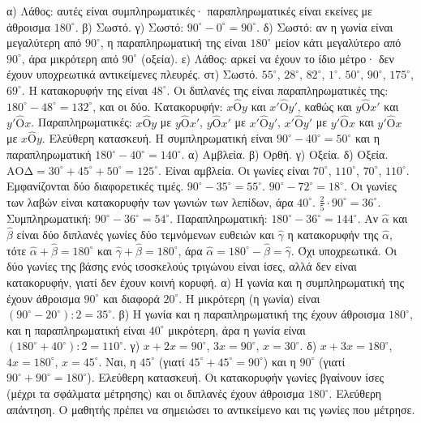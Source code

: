  α) Λάθος: αυτές είναι συμπληρωματικές· παραπληρωματικές είναι εκείνες με άθροισμα $180^\circ$. β) Σωστό. γ) Σωστό: $90^\circ-0^\circ=90^\circ$. δ) Σωστό: αν η γωνία είναι μεγαλύτερη από $90^\circ$, η παραπληρωματική της είναι $180^\circ$ μείον κάτι μεγαλύτερο από $90^\circ$, άρα μικρότερη από $90^\circ$ (οξεία). ε) Λάθος: αρκεί να έχουν το ίδιο μέτρο· δεν έχουν υποχρεωτικά αντικείμενες πλευρές. στ) Σωστό.
 $55^\circ$, $28^\circ$, $82^\circ$, $1^\circ$.
 $50^\circ$, $90^\circ$, $175^\circ$, $69^\circ$.
 Η κατακορυφήν της είναι $48^\circ$. Οι διπλανές της είναι παραπληρωματικές της: $180^\circ-48^\circ=132^\circ$, και οι δύο.
 Κατακορυφήν: $x\hat{\mathrm{Ο}}y$ και $x'\hat{\mathrm{Ο}}y'$, καθώς και $y\hat{\mathrm{Ο}}x'$ και $y'\hat{\mathrm{Ο}}x$. Παραπληρωματικές: $x\hat{\mathrm{Ο}}y$ με $y\hat{\mathrm{Ο}}x'$, $y\hat{\mathrm{Ο}}x'$ με $x'\hat{\mathrm{Ο}}y'$, $x'\hat{\mathrm{Ο}}y'$ με $y'\hat{\mathrm{Ο}}x$ και $y'\hat{\mathrm{Ο}}x$ με $x\hat{\mathrm{Ο}}y$.
 Ελεύθερη κατασκευή. Η συμπληρωματική είναι $90^\circ-40^\circ=50^\circ$ και η παραπληρωματική $180^\circ-40^\circ=140^\circ$.
 α) Αμβλεία. β) Ορθή. γ) Οξεία. δ) Οξεία.
 $\mathrm{ΑΟΔ}=30^\circ+45^\circ+50^\circ=125^\circ$. Είναι αμβλεία.
 Οι γωνίες είναι $70^\circ$, $110^\circ$, $70^\circ$, $110^\circ$. Εμφανίζονται δύο διαφορετικές τιμές.
 $90^\circ-35^\circ=55^\circ$.
 $90^\circ-72^\circ=18^\circ$.
 Οι γωνίες των λαβών είναι κατακορυφήν των γωνιών των λεπίδων, άρα $40^\circ$.
 $\frac{2}{5}\cdot90^\circ=36^\circ$. Συμπληρωματική: $90^\circ-36^\circ=54^\circ$. Παραπληρωματική: $180^\circ-36^\circ=144^\circ$.
 Αν $\hat{\alpha}$ και $\hat{\beta}$ είναι δύο διπλανές γωνίες δύο τεμνόμενων ευθειών και $\hat{\gamma}$ η κατακορυφήν της $\hat{\alpha}$, τότε $\hat{\alpha}+\hat{\beta}=180^\circ$ και $\hat{\gamma}+\hat{\beta}=180^\circ$, άρα $\hat{\alpha}=180^\circ-\hat{\beta}=\hat{\gamma}$.
 Όχι υποχρεωτικά. Οι δύο γωνίες της βάσης ενός ισοσκελούς τριγώνου είναι ίσες, αλλά δεν είναι κατακορυφήν, γιατί δεν έχουν κοινή κορυφή.
 α) Η γωνία και η συμπληρωματική της έχουν άθροισμα $90^\circ$ και διαφορά $20^\circ$. Η μικρότερη (η γωνία) είναι $(90^\circ-20^\circ):2=35^\circ$. β) Η γωνία και η παραπληρωματική της έχουν άθροισμα $180^\circ$, και η παραπληρωματική είναι $40^\circ$ μικρότερη, άρα η γωνία είναι $(180^\circ+40^\circ):2=110^\circ$. γ) $x+2x=90^\circ$, $3x=90^\circ$, $x=30^\circ$. δ) $x+3x=180^\circ$, $4x=180^\circ$, $x=45^\circ$.
 Ναι, η $45^\circ$ (γιατί $45^\circ+45^\circ=90^\circ$) και η $90^\circ$ (γιατί $90^\circ+90^\circ=180^\circ$).
 Ελεύθερη κατασκευή. Οι κατακορυφήν γωνίες βγαίνουν ίσες (μέχρι τα σφάλματα μέτρησης) και οι διπλανές έχουν άθροισμα $180^\circ$.
 Ελεύθερη απάντηση. Ο μαθητής πρέπει να σημειώσει το αντικείμενο και τις γωνίες που μέτρησε.
